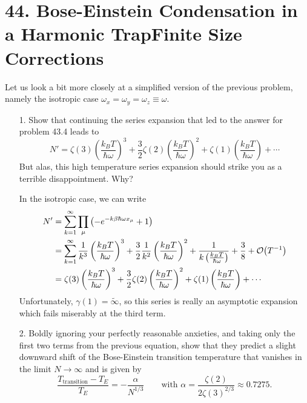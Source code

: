 \documentclass[a4paper,twoside]{article}
\begin{document}
\section*{44. Bose-Einstein Condensation in a Harmonic Trap\textemdash Finite Size Corrections}
Let us look a bit more closely at a simplified version of the previous problem, namely the isotropic case $ \omega_x = \omega_y = \omega_z \equiv \omega $.
\begin{itemize}
    \item[1.] Show that continuing the series expansion that led to the answer for problem 43.4 leads to
        \begin{equation}
            N' = \zeta(3) \left( \frac{k_B T}{\hbar \omega} \right)^3 + \frac{3}{2} \zeta(2) \left( \frac{k_B T}{\hbar \omega} \right)^2 + \zeta(1) \left( \frac{k_B T}{\hbar \omega} \right) + \cdots
        \end{equation}
        But alas, this high temperature series expansion should strike you as a terrible disappointment. Why?
        \begin{problem}
            In the isotropic case, we can write
            \begin{align}
                N' &= \sum_{k=1}^{\infty} \prod_{\mu} \left( - e^{-k \beta \hbar \omega x_{\mu}} + 1 \right) \\
                &= \sum_{k=1}^{\infty} \frac{1}{k^3} \left( \frac{k_B T}{\hbar \omega} \right)^3 + \frac{3}{2} \frac{1}{k^2} \left( \frac{k_B T}{\hbar \omega} \right)^2 + \frac{1}{k \left( \frac{k_B T}{\hbar \omega} \right)} + \frac{3}{8} + \order{T^{-1}} \\
                &= \zeta(3) \left( \frac{k_B T}{\hbar \omega} \right)^3 + \frac{3}{2} \zeta(2) \left( \frac{k_B T}{\hbar \omega} \right)^2 + \zeta(1) \left( \frac{k_B T}{\hbar \omega} \right) + \cdots
            \end{align}
            Unfortunately, $ \gamma(1) = \tilde{\infty} $, so this series is really an asymptotic expansion which fails miserably at the third term.
        \end{problem}
    \item[2.] Boldly ignoring your perfectly reasonable anxieties, and taking only the first two terms from the previous equation, show that they predict a slight downward shift of the Bose-Einstein transition temperature that vanishes in the limit $ N \to \infty $ and is given by
        \begin{equation}
            \frac{T_{\text{transition}} - T_E}{T_E} = - \frac{\alpha}{N^{1/3}} \qquad \text{with } \alpha = \frac{\zeta(2)}{2 \zeta(3)^{2/3}} \approx 0.7275.

\end{equation}
\end{itemize}
\end{document}
